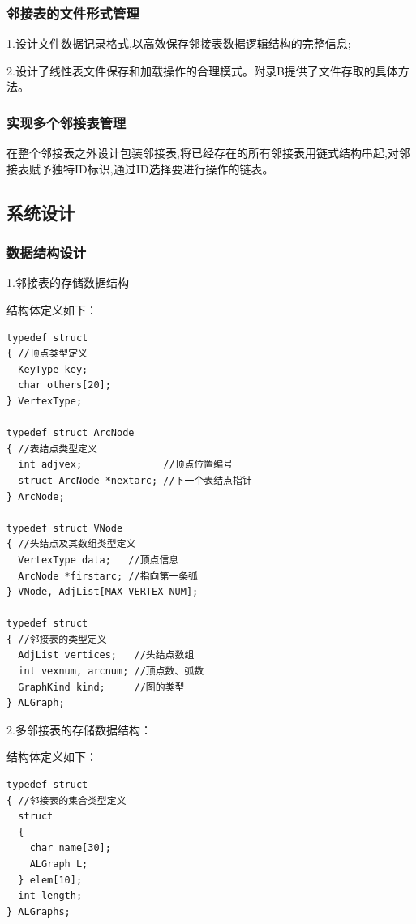 \documentclass[supercite]{Experimental_Report}
\theoremstyle{definition}
\begin{document}
\subsubsection{邻接表的文件形式管理}

1.设计文件数据记录格式,以高效保存邻接表数据逻辑结构的完整信息;

2.设计了线性表文件保存和加载操作的合理模式。附录B提供了文件存取的具体方法。

\subsubsection{实现多个邻接表管理}

在整个邻接表之外设计包装邻接表,将已经存在的所有邻接表用链式结构串起,对邻接表赋予独特ID标识,通过ID选择要进行操作的链表。

\subsection{系统设计}

\subsubsection{数据结构设计}

1.邻接表的存储数据结构

结构体定义如下：

\begin{lstlisting}
typedef struct
{ //顶点类型定义
  KeyType key;
  char others[20];
} VertexType;

typedef struct ArcNode
{ //表结点类型定义
  int adjvex;              //顶点位置编号
  struct ArcNode *nextarc; //下一个表结点指针
} ArcNode;

typedef struct VNode
{ //头结点及其数组类型定义
  VertexType data;   //顶点信息
  ArcNode *firstarc; //指向第一条弧
} VNode, AdjList[MAX_VERTEX_NUM];

typedef struct
{ //邻接表的类型定义
  AdjList vertices;   //头结点数组
  int vexnum, arcnum; //顶点数、弧数
  GraphKind kind;     //图的类型
} ALGraph;
\end{lstlisting}

2.多邻接表的存储数据结构：

结构体定义如下：

\begin{lstlisting}
typedef struct
{ //邻接表的集合类型定义
  struct
  {
    char name[30];
    ALGraph L;
  } elem[10];
  int length;
} ALGraphs;
\end{lstlisting}
\end{document}
